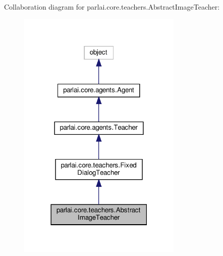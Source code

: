 Collaboration diagram for parlai.\+core.\+teachers.\+Abstract\+Image\+Teacher\+:
\nopagebreak
\begin{figure}[H]
\begin{center}
\leavevmode
\includegraphics[width=222pt]{dc/d47/classparlai_1_1core_1_1teachers_1_1AbstractImageTeacher__coll__graph}
\end{center}
\end{figure}
